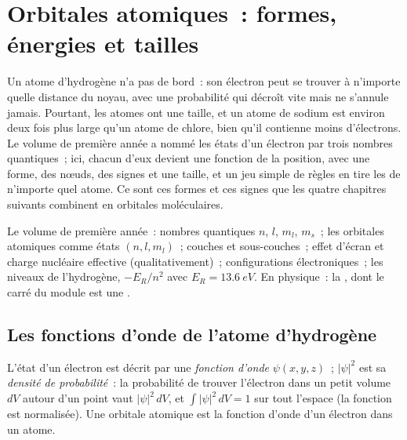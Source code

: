 \chapter{Orbitales atomiques~: formes, énergies et tailles}\label{ch:b2:atomic-orbitals}

Un atome d'hydrogène n'a pas de bord~: son électron peut se trouver à n'importe quelle distance du
noyau, avec une probabilité qui décroît vite mais ne s'annule jamais. Pourtant, les atomes
ont une taille, et un atome de sodium est environ deux fois plus large qu'un atome de
chlore, bien qu'il contienne moins d'électrons. Le volume de première année a nommé les
états d'un électron par trois nombres quantiques~; ici, chacun d'eux devient une
fonction de la position, avec une forme, des nœuds, des signes et une taille, et un jeu simple
de règles en tire les  de n'importe quel atome. Ce sont ces formes et ces signes
que les quatre chapitres suivants combinent en orbitales moléculaires.

\begin{recall}
Le volume de première année~: nombres quantiques $n$, $l$, $m_l$, $m_s$~; les orbitales atomiques comme
états $(n, l, m_l)$~; couches et sous-couches~; effet d'écran et charge nucléaire
effective (qualitativement)~; configurations électroniques~; les niveaux de l'hydrogène,
$-E_R/n^2$ avec $E_R = \qty{13.6}{eV}$. En physique~: la , dont le
carré du module est une .
\end{recall}

\section{Les fonctions d'onde de l'atome d'hydrogène}

\begin{definition}\label{def:b2:atomic-orbitals:wavefunction}
L'état d'un électron est décrit par une \emph{fonction d'onde}
$\psi(x, y, z)$~; $|\psi|^2$ est sa \emph{densité de probabilité}~:
la probabilité de trouver l'électron dans un petit volume $dV$ autour
d'un point vaut $|\psi|^2\,dV$, et $\int|\psi|^2\,dV = 1$ sur tout l'espace (la fonction
est normalisée). Une orbitale atomique est la fonction d'onde d'un électron dans un
atome.
\end{definition}

